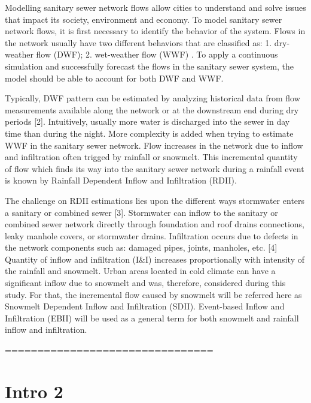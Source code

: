 Modelling sanitary sewer network flows allow cities to understand and solve issues that impact its society, environment and economy. To model sanitary sewer network flows, it is first necessary to identify the behavior of the system. Flows in the network usually have two different behaviors that are classified as: 1. dry-weather flow (DWF); 2. wet-weather flow (WWF) \parencite{Vallabhaneni2007}. To apply a continuous simulation and successfully forecast the flows in the sanitary sewer system, the model should be able to account for both DWF and WWF.

Typically, DWF pattern can be estimated by analyzing historical data from flow measurements available along the network or at the downstream end during dry periods [2]. Intuitively, usually more water is discharged into the sewer in day time than during the night. More complexity is added when trying to estimate WWF in the sanitary sewer network. Flow increases in the network due to inflow and infiltration often trigged by rainfall or snowmelt. This incremental quantity of flow which finds its way into the sanitary sewer network during a rainfall event is known by Rainfall Dependent Inflow and Infiltration (RDII).

The challenge on RDII estimations lies upon the different ways stormwater enters a sanitary or combined sewer [3]. Stormwater can inflow to the sanitary or combined sewer network directly through foundation and roof drains connections, leaky manhole covers, or stormwater drains.  Infiltration occurs due to defects in the network components such as: damaged pipes, joints, manholes, etc. [4]
Quantity of inflow and infiltration (I&I) increases proportionally with intensity of the rainfall and snowmelt. Urban areas located in cold climate can have a significant inflow due to snowmelt and was, therefore, considered during this study. For that, the incremental flow caused by snowmelt will be referred here as Snowmelt Dependent Inflow and Infiltration (SDII). Event-based Inflow and Infiltration (EBII) will be used as a general term for both snowmelt and rainfall inflow and infiltration.




================================
\section{Intro 2}


